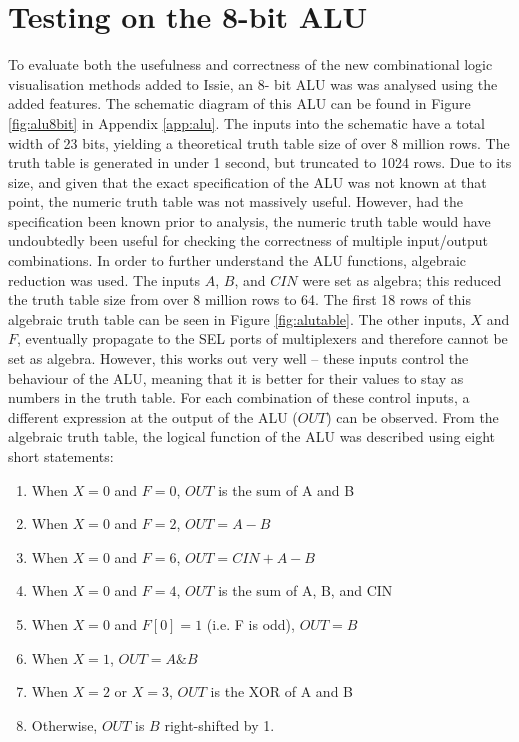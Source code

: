 
\section{Testing on the 8-bit ALU} \label{sec:alu}
To evaluate both the usefulness and correctness of the new combinational logic visualisation methods added to Issie, an 8- bit ALU was was analysed using the added features.
The schematic diagram of this ALU can be found in Figure \ref{fig:alu8bit} in Appendix \ref{app:alu}. The inputs into the schematic have a total width of 23 bits, yielding a theoretical truth table size of over 8 million rows. The truth table is generated in under 1 second, but truncated to 1024 rows. Due to its size, and given that the exact specification of the ALU was not known at that point, the numeric truth table was not massively useful. However, had the specification been known prior to analysis, the numeric truth table would have undoubtedly been useful for checking the correctness of multiple input/output combinations. In order to further understand the ALU functions, algebraic reduction was used. The inputs $A$, $B$, and $CIN$ were set as algebra; this reduced the truth table size from over 8 million rows to 64. The first 18 rows of this algebraic truth table can be seen in Figure \ref{fig:alutable}. The other inputs, $X$ and $F$, eventually propagate to the SEL ports of multiplexers and therefore cannot be set as algebra. However, this works out very well -- these inputs control the behaviour of the ALU, meaning that it is better for their values to stay as numbers in the truth table. For each combination of these control inputs, a different expression at the output of the ALU ($OUT$) can be observed. From the algebraic truth table, the logical function of the ALU was described using eight short statements:
\begin{enumerate}
    \item When $X = 0$ and $F = 0$, $OUT$ is the sum of A and B
    \item When $X = 0$ and $F = 2$, $OUT = A - B$
    \item When $X = 0$ and $F = 6$, $OUT = CIN + A - B$
    \item When $X = 0$ and $F = 4$, $OUT$ is the sum of A, B, and CIN
    \item When $X = 0$ and $F[0] = 1$ (i.e. F is odd), $OUT = B$
    \item When $X = 1$, $OUT = A \& B$
    \item When $X = 2$ or $X = 3$, $OUT$ is the XOR of A and B
    \item Otherwise, $OUT$ is $B$ right-shifted by 1.
\end{enumerate}


